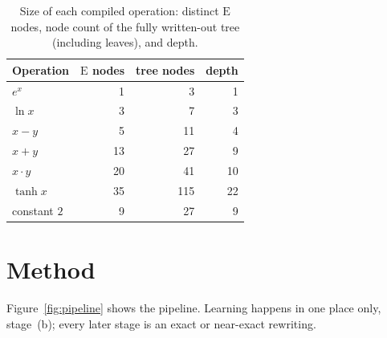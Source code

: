 \documentclass[11pt]{article}
\newcommand{\E}{\mathrm{E}}
\begin{document}
\begin{table}[htbp]
\centering
\caption{Size of each compiled operation: distinct $\E$ nodes, node count
of the fully written-out tree (including leaves), and depth.}
\label{tab:recipes}
\small
\begin{tabular}{lrrr}
\toprule
Operation & $\E$ nodes & tree nodes & depth \\
\midrule
$e^{x}$       & 1  & 3   & 1 \\
$\ln x$       & 3  & 7   & 3 \\
$x-y$         & 5  & 11  & 4 \\
$x+y$         & 13 & 27  & 9 \\
$x\cdot y$    & 20 & 41  & 10 \\
$\tanh x$     & 35 & 115 & 22 \\
constant $2$  & 9  & 27  & 9 \\
\bottomrule
\end{tabular}
\end{table}

\section{Method}
\label{sec:method}

Figure~\ref{fig:pipeline} shows the pipeline. Learning happens in one place
only, stage~(b); every later stage is an exact or near-exact rewriting.
\end{document}
